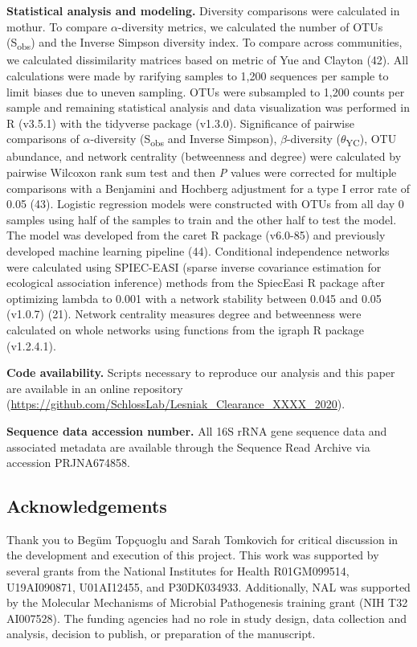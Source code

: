 \documentclass[11pt,]{article}
\begin{document}
\textbf{Statistical analysis and modeling.} Diversity comparisons were
calculated in mothur. To compare \(\alpha\)-diversity metrics, we
calculated the number of OTUs (S\textsubscript{obs}) and the Inverse
Simpson diversity index. To compare across communities, we calculated
dissimilarity matrices based on metric of Yue and Clayton (42). All
calculations were made by rarifying samples to 1,200 sequences per
sample to limit biases due to uneven sampling. OTUs were subsampled to
1,200 counts per sample and remaining statistical analysis and data
visualization was performed in R (v3.5.1) with the tidyverse package
(v1.3.0). Significance of pairwise comparisons of \(\alpha\)-diversity
(S\textsubscript{obs} and Inverse Simpson), \(\beta\)-diversity
(\(\theta\)\textsubscript{YC}), OTU abundance, and network centrality
(betweenness and degree) were calculated by pairwise Wilcoxon rank sum
test and then \emph{P} values were corrected for multiple comparisons
with a Benjamini and Hochberg adjustment for a type I error rate of 0.05
(43). Logistic regression models were constructed with OTUs from all day
0 samples using half of the samples to train and the other half to test
the model. The model was developed from the caret R package (v6.0-85)
and previously developed machine learning pipeline (44). Conditional
independence networks were calculated using SPIEC-EASI (sparse inverse
covariance estimation for ecological association inference) methods from
the SpiecEasi R package after optimizing lambda to 0.001 with a network
stability between 0.045 and 0.05 (v1.0.7) (21). Network centrality
measures degree and betweenness were calculated on whole networks using
functions from the igraph R package (v1.2.4.1).

\textbf{Code availability.} Scripts necessary to reproduce our analysis
and this paper are available in an online repository
(\url{https://github.com/SchlossLab/Lesniak_Clearance_XXXX_2020}).

\textbf{Sequence data accession number.} All 16S rRNA gene sequence data
and associated metadata are available through the Sequence Read Archive
via accession PRJNA674858.

\hypertarget{acknowledgements}{%
\subsection{Acknowledgements}\label{acknowledgements}}

Thank you to Begüm Topçuoglu and Sarah Tomkovich for critical discussion
in the development and execution of this project. This work was
supported by several grants from the National Institutes for Health
R01GM099514, U19AI090871, U01AI12455, and P30DK034933. Additionally, NAL
was supported by the Molecular Mechanisms of Microbial Pathogenesis
training grant (NIH T32 AI007528). The funding agencies had no role in
study design, data collection and analysis, decision to publish, or
preparation of the manuscript.
\end{document}
